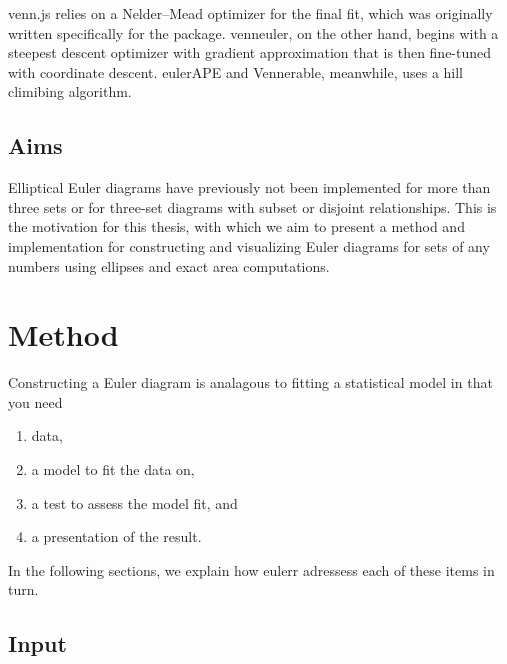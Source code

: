 \documentclass[
  oneside,
  openany,
  numbers=noendperiod,
  parskip=half,
  bibliography=totoc
]{scrbook}\usepackage[]{graphicx}\usepackage{xcolor}
\newcommand{\pkg}[1]{{\fontseries{b}\selectfont #1}}
\begin{document}
\pkg{venn.js} relies on a Nelder--Mead optimizer for the final fit, which
was originally written specifically for the package.
\pkg{venneuler}, on the other hand, begins with a
steepest descent optimizer with gradient approximation that is then fine-tuned with
coordinate descent. \pkg{eulerAPE} and \pkg{Vennerable}, meanwhile,
uses a hill climibing algorithm.

\section{Aims}
\label{sec:aims}

Elliptical Euler diagrams have previously not been implemented for more than
three sets or for three-set diagrams with subset or disjoint relationships. This
is the motivation for this thesis, with which we aim to present
a method and implementation for constructing and visualizing Euler diagrams for
sets of any numbers using ellipses and exact area computations.

\chapter{Method}
\label{ch:method}

Constructing a Euler diagram is analagous to fitting a statistical model in that
you need
\begin{enumerate}
\item data,
\item a model to fit the data on,
\item a test to assess the model fit, and
\item a presentation of the result.
\end{enumerate}
In the following sections, we explain how \pkg{eulerr} adressess each of these
items in turn.

\section{Input}
\label{sec:input}
\end{document}
